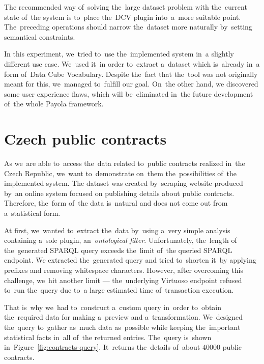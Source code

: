 The recommended way of~solving the~large dataset problem with the~current state of~the system
is to~place the~DCV 
plugin into~a~more suitable point. The~preceding operations should narrow the~dataset more naturally by~setting semantical constraints.

In this experiment, we~tried to~use the~implemented system in~a slightly 
different use case. We~used it~in order to~extract a~dataset which is~already in~a form of~Data Cube Vocabulary. Despite the~fact that the~tool was not 
originally meant for this, we~managed to~fulfill our goal. On~the other hand, 
we discovered some user experience flaws, which will be~eliminated in~the future 
development of~the whole Payola framework.

\section{Czech public contracts}
As we~are able to~access the~data related to~public contracts realized in~the 
Czech Republic, we~want to~demonstrate on~them the~possibilities of~the implemented system.
The dataset was created by~scraping website produced by~an online system focused 
on publishing details about public contracts. Therefore, the~form of~the data is~natural and does not come out from a~statistical form.

At first, we~wanted to~extract the~data by~using a~very simple analysis
containing a~sole plugin, an~\emph{ontological filter}. Unfortunately, the~length
of the~generated SPARQL query exceeds the~limit of~the queried SPARQL endpoint.
We extracted the~generated query and tried to~shorten it~by applying prefixes 
and removing whitespace characters. However, after overcoming this challenge, we~hit another limit --- the~underlying Virtuoso endpoint refused to~run the~query 
due to~a large estimated time of~transaction execution.

That is~why we~had to~construct a~custom query in~order to~obtain the~required 
data for making a~preview and a~transformation. We~designed the~query to~gather as~much data as~possible while keeping the~important statistical facts in~all of~the returned entries. The~query is~shown in~Figure~\ref{fig:contracts-query}. It~returns the~details of~about $40000$ public 
contracts.

